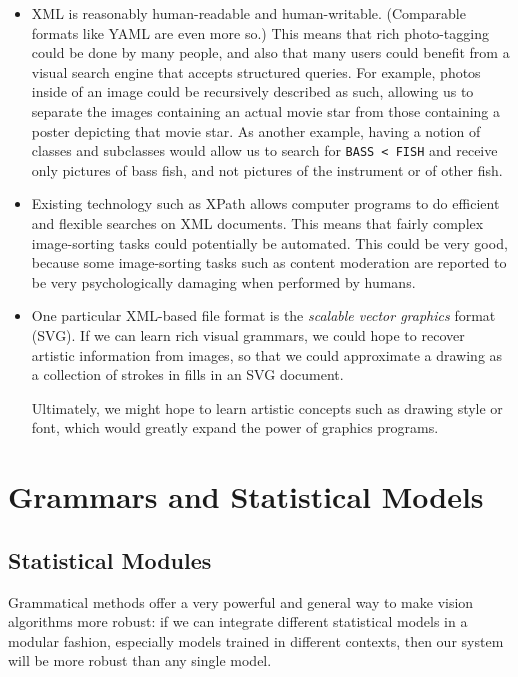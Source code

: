 \begin{itemize}
\item XML is reasonably human-readable and human-writable. (Comparable
  formats like YAML are even more so.) This means that rich
  photo-tagging could be done by many people, and also that many users
  could benefit from a visual search engine that accepts structured
  queries. For example, photos inside of an image could be recursively
  described as such, allowing us to separate the images containing an
  actual movie star from those containing a poster depicting that
  movie star. As another example, having a notion of classes and
  subclasses would allow us to search for \texttt{BASS < FISH} and
  receive only pictures of bass fish, and not pictures of the
  instrument or of other fish.

\item Existing technology such as XPath allows computer programs to do
  efficient and flexible searches on XML documents. This means that
  fairly complex image-sorting tasks could potentially be automated.
  This could be very good, because some image-sorting tasks such as
  content moderation are reported to be very psychologically
  damaging when performed by humans.

\item One particular XML-based file format is the \emph{scalable
    vector graphics} format (SVG). If we can learn rich visual
  grammars, we could hope to recover artistic information from images,
  so that we could approximate a drawing as a collection of strokes in
  fills in an SVG document.

  Ultimately, we might hope to learn artistic concepts such as drawing
  style or font, which would greatly expand the power of graphics
  programs.
\end{itemize}

\section{Grammars and Statistical Models}



\subsection{Statistical Modules}
\label{sec-modules}

Grammatical methods offer a very powerful and general way to make
vision algorithms more robust: if we can integrate different
statistical models in a modular fashion, especially models trained in
different contexts, then our system will be more robust than any
single model.

